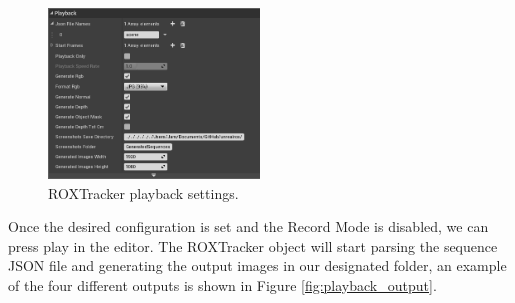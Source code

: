 \begin{figure}[h]
	\includegraphics[width=0.5\textwidth]{archivos/playback_settings.png}
	\centering
	\caption{ROXTracker playback settings.}
	\label{fig:playback_settings}
\end{figure}

Once the desired configuration is set and the Record Mode is disabled, we can press play in the editor. The ROXTracker object will start parsing the sequence JSON file and generating the output images in our designated folder, an example of the four different outputs is shown in Figure \ref{fig:playback_output}.

